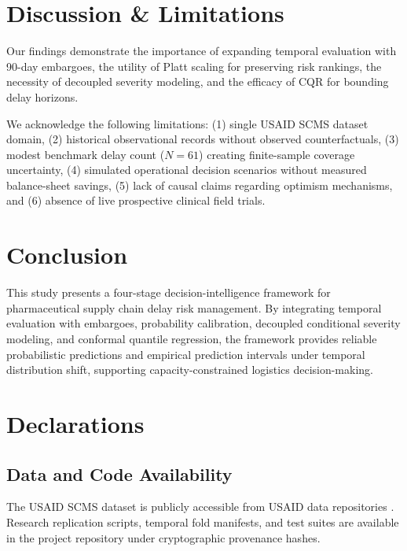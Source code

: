 \documentclass[11pt,a4paper]{article}
\begin{document}
\section{Discussion \& Limitations}
Our findings demonstrate the importance of expanding temporal evaluation with 90-day embargoes, the utility of Platt scaling for preserving risk rankings, the necessity of decoupled severity modeling, and the efficacy of CQR for bounding delay horizons.

We acknowledge the following limitations: (1) single USAID SCMS dataset domain, (2) historical observational records without observed counterfactuals, (3) modest benchmark delay count ($N=61$) creating finite-sample coverage uncertainty, (4) simulated operational decision scenarios without measured balance-sheet savings, (5) lack of causal claims regarding optimism mechanisms, and (6) absence of live prospective clinical field trials.

\section{Conclusion}
This study presents a four-stage decision-intelligence framework for pharmaceutical supply chain delay risk management. By integrating temporal evaluation with embargoes, probability calibration, decoupled conditional severity modeling, and conformal quantile regression, the framework provides reliable probabilistic predictions and empirical prediction intervals under temporal distribution shift, supporting capacity-constrained logistics decision-making.

\section*{Declarations}
\subsection*{Data and Code Availability}
The USAID SCMS dataset is publicly accessible from USAID data repositories \cite{scmsdataset2016}. Research replication scripts, temporal fold manifests, and test suites are available in the project repository under cryptographic provenance hashes.



\end{document}
